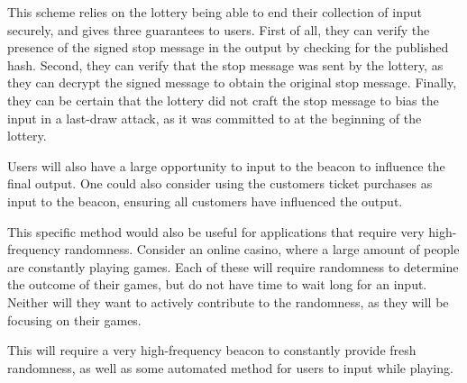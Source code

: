 This scheme relies on the lottery being able to end their collection of input securely, and gives three guarantees to users. First of all, they can verify the presence of the signed stop message in the output by checking for the published hash. Second, they can verify that the stop message was sent by the lottery, as they can decrypt the signed message to obtain the original stop message. Finally, they can be certain that the lottery did not craft the stop message to bias the input in a last-draw attack, as it was committed to at the beginning of the lottery.

Users will also have a large opportunity to input to the beacon to influence the final output. One could also consider using the customers ticket purchases as input to the beacon, ensuring all customers have influenced the output.

This specific method would also be useful for applications that require very high-frequency randomness. Consider an online casino, where a large amount of people are constantly playing games. Each of these will require randomness to determine the outcome of their games, but do not have time to wait long for an input. Neither will they want to actively contribute to the randomness, as they will be focusing on their games.

This will require a very high-frequency beacon to constantly provide fresh randomness, as well as some automated method for users to input while playing.